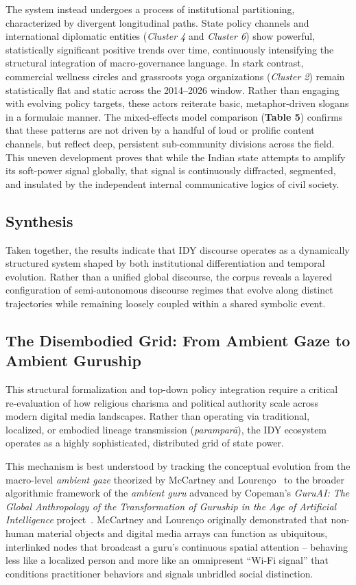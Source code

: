\documentclass[11pt]{article}
\begin{document}
{The system instead undergoes a process of institutional partitioning, characterized by divergent longitudinal paths. State policy channels and international diplomatic entities (\textit{Cluster 4} and \textit{Cluster 6}) show powerful, statistically significant positive trends over time, continuously intensifying the structural integration of macro-governance language. In stark contrast, commercial wellness circles and grassroots yoga organizations (\textit{Cluster 2}) remain statistically flat and static across the 2014--2026 window. Rather than engaging with evolving policy targets, these actors reiterate basic, metaphor-driven slogans in a formulaic manner. The mixed-effects model comparison (\textbf{Table 5}) confirms that these patterns are not driven by a handful of loud or prolific content channels, but reflect deep, persistent sub-community divisions across the field. This uneven development proves that while the Indian state attempts to amplify its soft-power signal globally, that signal is continuously diffracted, segmented, and insulated by the independent internal communicative logics of civil society.


\subsection{Synthesis}

Taken together, the results indicate that IDY discourse operates as a dynamically structured system shaped by both institutional differentiation and temporal evolution. Rather than a unified global discourse, the corpus reveals a layered configuration of semi-autonomous discourse regimes that evolve along distinct trajectories while remaining loosely coupled within a shared symbolic event.

\subsection{The Disembodied Grid: From Ambient Gaze to Ambient Guruship}
This structural formalization and top-down policy integration require a critical re-evaluation of how religious charisma and political authority scale across modern digital media landscapes. Rather than operating via traditional, localized, or embodied lineage transmission (\textit{parampar\={a}}), the IDY ecosystem operates as a highly sophisticated, distributed grid of state power. 

This mechanism is best understood by tracking the conceptual evolution from the macro-level \textit{ambient gaze} theorized by McCartney and Louren\c{c}o~\cite{mccartney2023} to the broader algorithmic framework of the \textit{ambient guru} advanced by Copeman's \textit{GuruAI: The Global Anthropology of the Transformation of Guruship in the Age of Artificial Intelligence} project~\cite{copeman2023,idega2026}. McCartney and Louren\c{c}o originally demonstrated that non-human material objects and digital media arrays can function as ubiquitous, interlinked nodes that broadcast a guru's continuous spatial attention -- behaving less like a localized person and more like an omnipresent ``Wi-Fi signal'' that conditions practitioner behaviors and signals unbridled social distinction.

}
\end{document}
